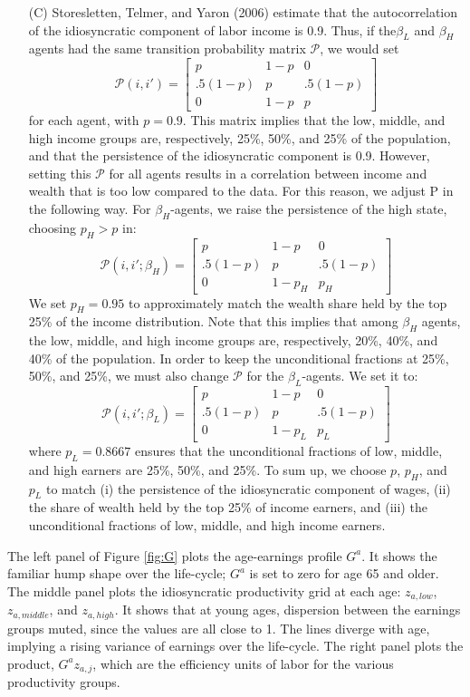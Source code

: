 \documentclass[letterpaper,12pt,dvipsnames,usenames]{article}
\theoremstyle{definition}
\begin{document}
\begin{spacing}{1.0}
\begin{small}
\begin{enumerate}
\item[(C)] Storesletten, Telmer, and Yaron (2006) estimate that the autocorrelation of the idiosyncratic component of labor income is 0.9. Thus, if the$\beta_L$ and $\beta_H$ agents had the same transition probability matrix $\mathcal{P}$, we would set
\[
\mathcal{P}(i,i') = \left[
\begin{array}{ccc}
p & 1-p & 0 \\
.5(1-p) & p &  .5(1-p) \\
0 & 1-p& p
\end{array}
\right]
\]
for each agent, with $p=0.9$. This matrix implies that the low, middle, and high income groups are, respectively, 25\%, 50\%, and 25\% of the population, and that the persistence of the idiosyncratic component is 0.9. However, setting this $\mathcal{P}$ for all agents results in a correlation between income and wealth that is too low compared to the data. For this reason, we adjust P in the following way. For $\beta_H$-agents, we raise the persistence of the high state, choosing $p_H>p$ in:
\[
\mathcal{P}(i,i';\beta_H) = \left[
\begin{array}{ccc}
p & 1-p & 0 \\
.5(1-p) & p &  .5(1-p) \\
0 & 1-p_H& p_H
\end{array}
\right]
\]
We set $p_H=0.95$ to approximately match the wealth share held by the top 25\% of the income distribution. Note that this implies that among $\beta_H$ agents, the low, middle, and high income groups are, respectively, 20\%, 40\%, and 40\% of the population. In order to keep the unconditional fractions at 25\%, 50\%, and 25\%, we must also change $\mathcal{P}$ for the $\beta_L$-agents. We set it to:
\[
\mathcal{P}(i,i';\beta_L) = \left[
\begin{array}{ccc}
p & 1-p & 0 \\
.5(1-p) & p &  .5(1-p) \\
0 & 1-p_L& p_L
\end{array}
\right]
\]
where $p_L=0.8667$ ensures that the unconditional fractions of low, middle, and high earners are 25\%, 50\%, and 25\%. To sum up, we choose $p$, $p_H$, and $p_L$ to match (i) the persistence of the idiosyncratic component of wages, (ii) the share of wealth held by the top 25\% of income earners, and (iii) the unconditional fractions of low, middle, and high income earners.
\end{enumerate}

The left panel of Figure \ref{fig:G} plots the age-earnings profile $G^a$. It shows the familiar hump shape over the life-cycle; $G^a$ is set to zero for age 65 and older. The middle panel plots the idiosyncratic productivity grid at each age: $z_{a,low}$, $z_{a,middle}$, and $z_{a,high}$. It shows that at young ages, dispersion between the earnings groups muted, since the values are all close to 1. The lines diverge with age, implying a rising variance of earnings over the life-cycle. The right panel plots the product, $G^a z_{a,j}$, which are the efficiency units of labor for the various productivity groups.


\end{small}
\end{spacing}
\end{document}
